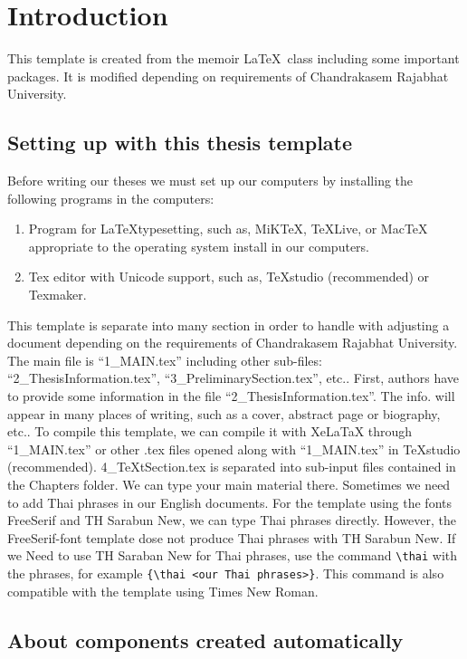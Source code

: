 \chapter{Introduction}


This template is created from the memoir \LaTeX\ class including some important packages. It is modified depending on requirements of Chandrakasem Rajabhat University.


\section{Setting up with this thesis template}

Before writing our theses we must set up our computers by installing the following programs in the computers:
\begin{enumerate}[\quad1)]
	\item Program for \LaTeX typesetting, such as, MiKTeX, TeXLive, or MacTeX appropriate to the operating system install in our computers.
	\item Tex editor with Unicode support, such as, TeXstudio (recommended) or Texmaker.
\end{enumerate}
This template is separate into many section in order to handle with adjusting a document depending on the requirements of Chandrakasem Rajabhat University. The main file is “1\_MAIN.tex” including other sub-files: “2\_ThesisInformation.tex”, “3\_PreliminarySection.tex”, etc.. First, authors have to provide some information in the file “2\_ThesisInformation.tex”. The info. will appear in many places of writing, such as a cover, abstract page or biography, etc.. To compile this template, we can compile it with XeLaTaX through “1\_MAIN.tex” or other .tex files opened along with “1\_MAIN.tex” in TeXstudio (recommended). 4\_TeXtSection.tex is separated into sub-input files contained in the Chapters folder. We can type your main material there.
Sometimes we need to add Thai phrases in our English documents. For the template using the fonts FreeSerif and TH Sarabun New, we can type Thai phrases directly. However, the FreeSerif-font template dose not produce Thai phrases with TH Sarabun New. If we Need to use TH Saraban New for Thai phrases, use the command \verb|\thai| with the phrases, for example \verb|{\thai <our Thai phrases>}|. This command is also compatible with the template using Times New Roman.




\section{About components created automatically}

